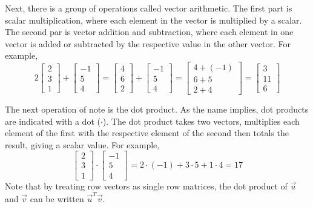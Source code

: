 \documentclass[12pt,]{article}
\begin{document}
Next, there is a group of operations called vector arithmetic\label{vector arithmetic}.
The first part is scalar multiplication, where each element in the vector is multiplied by a scalar.
The second par is vector addition and subtraction, where each element in one vector is added or subtracted by the respective value in the other vector.
For example,
\begin{equation}
	2
	\begin{bmatrix}2 \\ 3 \\ 1\end{bmatrix}
	+
	\begin{bmatrix}-1 \\ 5 \\ 4\end{bmatrix}
	=
	\begin{bmatrix}4 \\ 6 \\ 2\end{bmatrix}
	+
	\begin{bmatrix}-1 \\ 5 \\ 4\end{bmatrix}
	=
	\begin{bmatrix}4 + (-1) \\ 6 + 5 \\ 2 + 4\end{bmatrix}
	=
	\begin{bmatrix}3 \\ 11 \\ 6\end{bmatrix}
\end{equation}

The next operation of note is the dot product.
As the name implies, dot products are indicated with a dot (\(\cdot\)).
The dot product takes two vectors, multiplies each element of the first with the respective element of the second then totals the result, giving a scalar value.
For example,
\begin{equation}
	\begin{bmatrix}2 \\ 3 \\ 1\end{bmatrix}
	\cdot
	\begin{bmatrix}-1 \\ 5 \\ 4\end{bmatrix}
	=
	2\cdot(-1) + 3\cdot5 + 1\cdot 4
	= 17
\end{equation}
Note that by treating row vectors as single row matrices, the dot product of \(\vec{u}\) and \(\vec{v}\) can be written \(\vec{u}^T\vec{v}\).
\end{document}
